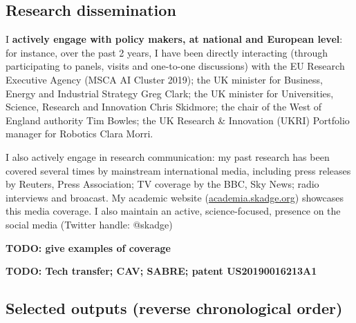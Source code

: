 \documentclass[11pt,a4paper]{report}
\newcommand{\TODO}[1]{{\color{red}\textbf{TODO: #1}}}
\begin{document}
\subsection{Research dissemination}

I \textbf{actively engage with policy makers, at national and European
level}: for instance, over the past 2 years, I have been directly interacting
(through participating to panels, visits and one-to-one discussions) with the EU
Research Executive Agency (MSCA AI Cluster 2019); the UK minister for Business,
Energy and Industrial Strategy Greg Clark; the UK minister for Universities,
Science, Research and Innovation Chris Skidmore; the chair of the West of
England authority Tim Bowles; the UK Research \& Innovation (UKRI) Portfolio
manager for Robotics Clara Morri.


I also actively engage in research communication: my past research has been
covered several times by mainstream international media, including press
releases by Reuters, Press Association; TV coverage by the BBC, Sky News; radio
interviews and broacast. My academic website (\url{academia.skadge.org})
showcases this media coverage. I also maintain an active, science-focused, presence on the social
media (Twitter handle: @skadge)

\TODO{give examples of coverage}

\TODO{Tech transfer; CAV; SABRE; patent US20190016213A1}

\newpage
\subsection{Selected outputs (reverse chronological order)}
\end{document}

